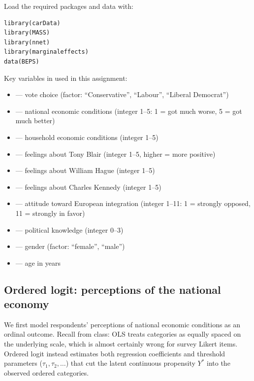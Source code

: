 Load the required packages and data with:
\begin{lstlisting}
library(carData)
library(MASS)
library(nnet)
library(marginaleffects)
data(BEPS)
\end{lstlisting}

Key variables in  used in this assignment:
\begin{itemize}
  \item {} --- vote choice (factor: ``Conservative'', ``Labour'', ``Liberal Democrat'')
  \item {} --- national economic conditions (integer 1--5: 1 = got much worse, 5 = got much better)
  \item {} --- household economic conditions (integer 1--5)
  \item {} --- feelings about Tony Blair (integer 1--5, higher = more positive)
  \item {} --- feelings about William Hague (integer 1--5)
  \item {} --- feelings about Charles Kennedy (integer 1--5)
  \item {} --- attitude toward European integration (integer 1--11: 1 = strongly opposed, 11 = strongly in favor)
  \item {} --- political knowledge (integer 0--3)
  \item {} --- gender (factor: ``female'', ``male'')
  \item {} --- age in years
\end{itemize}

\subsection{Ordered logit: perceptions of the national economy}

We first model respondents' perceptions of national economic conditions as an ordinal outcome. Recall from class: OLS treats categories as equally spaced on the underlying scale, which is almost certainly wrong for survey Likert items. Ordered logit instead estimates both regression coefficients and threshold parameters ($\tau_1, \tau_2, \ldots$) that cut the latent continuous propensity $Y^*$ into the observed ordered categories.

